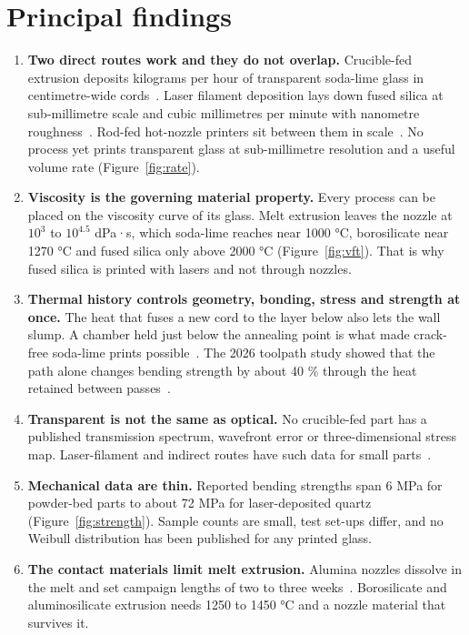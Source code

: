 \documentclass[10pt,a4paper]{article}
\begin{document}
\section{Principal findings}

\begin{enumerate}
  \item \textbf{Two direct routes work and they do not overlap.} Crucible-fed extrusion deposits kilograms per hour of transparent soda-lime glass in centimetre-wide cords~\citep{klein2015,inamura2018,mit2024masonry}. Laser filament deposition lays down fused silica at sub-millimetre scale and cubic millimetres per minute with nanometre roughness~\citep{kth2022bonding,lgd2024homog,kth2024microlens}. Rod-fed hot-nozzle printers sit between them in scale~\citep{chhadeh2026toolpath}. No process yet prints transparent glass at sub-millimetre resolution and a useful volume rate (Figure~\ref{fig:rate}).
  \item \textbf{Viscosity is the governing material property.} Every process can be placed on the viscosity curve of its glass. Melt extrusion leaves the nozzle at $10^{3}$ to $10^{4.5}$ dPa·s, which soda-lime reaches near 1000 °C, borosilicate near 1270 °C and fused silica only above 2000 °C (Figure~\ref{fig:vft}). That is why fused silica is printed with lasers and not through nozzles.
  \item \textbf{Thermal history controls geometry, bonding, stress and strength at once.} The heat that fuses a new cord to the layer below also lets the wall slump. A chamber held just below the annealing point is what made crack-free soda-lime prints possible~\citep{klein2015}. The 2026 toolpath study showed that the path alone changes bending strength by about 40 \% through the heat retained between passes~\citep{chhadeh2026toolpath}.
  \item \textbf{Transparent is not the same as optical.} No crucible-fed part has a published transmission spectrum, wavefront error or three-dimensional stress map. Laser-filament and indirect routes have such data for small parts~\citep{luo2018quartz,lgd2024homog,destino2018}.
  \item \textbf{Mechanical data are thin.} Reported bending strengths span 6 MPa for powder-bed parts to about 72 MPa for laser-deposited quartz (Figure~\ref{fig:strength}). Sample counts are small, test set-ups differ, and no Weibull distribution has been published for any printed glass.
  \item \textbf{The contact materials limit melt extrusion.} Alumina nozzles dissolve in the melt and set campaign lengths of two to three weeks~\citep{inamura2018}. Borosilicate and aluminosilicate extrusion needs 1250 to 1450 °C and a nozzle material that survives it.

\end{enumerate}
\end{document}
